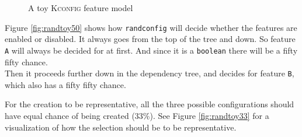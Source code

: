 \documentclass[a4paper,11pt]{report}
\newcommand{\figa}{
    \begin{figure}[!htpb]
    \centering
}
\newcommand{\figb}[2]{
    \caption{#1}
    \label{#2}
    \end{figure}
}
\begin{document}
\figa
    \subfigure{
        
    }
\figb{A toy \textsc{Kconfig} feature model}{randconfigtoy}

Figure \ref{fig:randtoy50} shows how \texttt{randconfig} will decide whether 
the features are enabled or disabled. It always goes from the top of the tree 
and down. So feature \texttt{A} will always be decided for at first. And since 
it is a \texttt{boolean} there will be a fifty fifty chance.
\\

Then it proceeds further down in the dependency tree, and decides for feature
\texttt{B}, which also has a fifty fifty chance.

For the creation to be representative, all the three possible configurations 
should have equal chance of being created (33\%). See Figure 
\ref{fig:randtoy33} for a visualization of how the selection should 
be to be representative.
\end{document}
